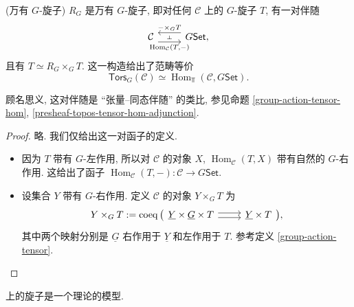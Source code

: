 \begin{prop}
	{(万有 $G$-旋子)}
	$R_G$ 是万有 $G$-旋子, 即对任何\topos{} $\mathcal C$ 上的 $G$-旋子 $T$, 有一对伴随
	\[\begin{tikzcd}[ampersand replacement=\&]
		{\mathcal C} \& {G\mathsf {Set},}
		\arrow[""{name=0, anchor=center, inner sep=0}, "{\operatorname{Hom}_{\mathcal C}(T,-)}"', shift right=2, from=1-1, to=1-2]
		\arrow[""{name=1, anchor=center, inner sep=0}, "{-\times_{G}T}"', shift right=2, from=1-2, to=1-1]
		\arrow["\dashv"{anchor=center, rotate=-90}, draw=none, from=1, to=0]
	\end{tikzcd}\]
	且有 $T\simeq R_G\times_G T$. 这一构造给出了范畴等价
	\[
	\mathsf{Tors}_G(\mathcal C)\simeq\operatorname{Hom}_{\Top}(\mathcal C,G\mathsf {Set}).
	\]
\end{prop}
顾名思义, 这对伴随是 ``张量--同态伴随'' 的类比, 参见命题 \ref{group-action-tensor-hom}, \ref{presheaf-topos-tensor-hom-adjunction}.
\begin{proof} 略. 我们仅给出这一对函子的定义.
\begin{itemize}
	\item 因为 $T$ 带有 $G$-左作用, 所以对 $\mathcal C$ 的对象 $X$, $\operatorname{Hom}_{\mathcal C}(T,X)$ 带有自然的 $G$-右作用. 这给出了函子 $\operatorname{Hom}_{\mathcal C}(T,-)\colon \mathcal C\to G\mathsf {Set}$.
	\item 设集合 $Y$ 带有 $G$-右作用. 定义 $\mathcal C$ 的对象 $Y\times_G T$ 为
	\[
	Y\times_G T := \operatorname{coeq}\big(
		\begin{tikzcd}[ampersand replacement=\&]
			{\underline Y\times \underline G \times T} \& {\underline Y\times T}
			\arrow[shift left, from=1-1, to=1-2]
			\arrow[shift right, from=1-1, to=1-2]
		\end{tikzcd}
	\big),
	\]
	其中两个映射分别是 $\underline G$ 右作用于 $\underline Y$ 和左作用于 $T$. 参考定义 \ref{group-action-tensor}.
\end{itemize}
\end{proof}



\topos{}上的旋子是一个理论的模型.


